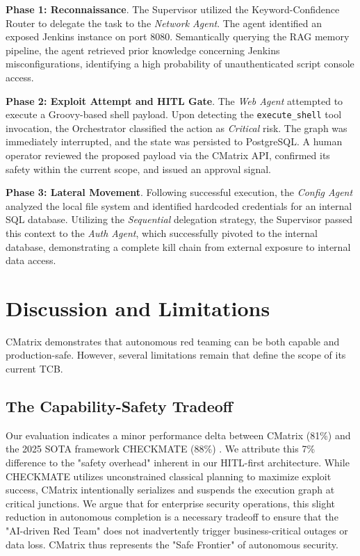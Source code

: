 \documentclass[conference,compsoc]{IEEEtran}
\begin{document}
\textbf{Phase 1: Reconnaissance}. The Supervisor utilized the Keyword-Confidence Router to delegate the task to the \textit{Network Agent}. The agent identified an exposed Jenkins instance on port 8080. Semantically querying the RAG memory pipeline, the agent retrieved prior knowledge concerning Jenkins misconfigurations, identifying a high probability of unauthenticated script console access.

\textbf{Phase 2: Exploit Attempt and HITL Gate}. The \textit{Web Agent} attempted to execute a Groovy-based shell payload. Upon detecting the \texttt{execute\_shell} tool invocation, the Orchestrator classified the action as \textit{Critical} risk. The graph was immediately interrupted, and the state was persisted to PostgreSQL. A human operator reviewed the proposed payload via the CMatrix API, confirmed its safety within the current scope, and issued an approval signal.

\textbf{Phase 3: Lateral Movement}. Following successful execution, the \textit{Config Agent} analyzed the local file system and identified hardcoded credentials for an internal SQL database. Utilizing the \textit{Sequential} delegation strategy, the Supervisor passed this context to the \textit{Auth Agent}, which successfully pivoted to the internal database, demonstrating a complete kill chain from external exposure to internal data access.

\section{Discussion and Limitations}
CMatrix demonstrates that autonomous red teaming can be both capable and production-safe. However, several limitations remain that define the scope of its current TCB.

\subsection{The Capability-Safety Tradeoff}
Our evaluation indicates a minor performance delta between CMatrix (81\%) and the 2025 SOTA framework CHECKMATE (88\%) \cite{checkmate2025}. We attribute this 7\% difference to the "safety overhead" inherent in our HITL-first architecture. While CHECKMATE utilizes unconstrained classical planning to maximize exploit success, CMatrix intentionally serializes and suspends the execution graph at critical junctions. We argue that for enterprise security operations, this slight reduction in autonomous completion is a necessary tradeoff to ensure that the "AI-driven Red Team" does not inadvertently trigger business-critical outages or data loss. CMatrix thus represents the "Safe Frontier" of autonomous security.
\end{document}
